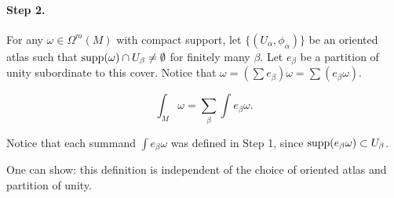 \paragraph{Step 2.}
For any $\omega \in \Omega^{m}(M)$ with compact support, let $\{(U_\alpha, \phi_\alpha)\} $ be an oriented atlas such that $\operatorname{supp}(\omega) \cap U_\beta \neq \emptyset$ for finitely many $\beta$.
Let  $e_\beta$ be a partition of unity subordinate to this cover.
Notice that  $\omega = (\sum e_\beta) \omega = \sum (e_\beta \omega)$.
 \begin{definition}
    \[
    \int_M \omega = \sum_\beta \int e_\beta \omega
    .\] 
\end{definition}
Notice that each summand  $\int e_\beta \omega$ was defined in Step 1, since $\operatorname{supp}(e_\beta \omega)\subset U_{\beta}$.

\begin{remark}
 One can show: this definition is independent of the choice of oriented atlas and partition of unity.
\end{remark}
